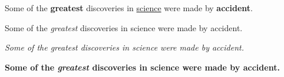 \documentclass{article}
\begin{document}
    Some of the \textbf{greatest} discoveries in \underline{science} were made by \textbf{accident}.

    Some of the \emph{greatest} discoveries in science were made by accident.

    \textit{Some of the \emph{greatest} discoveries in science were made by accident.}

    \textbf{Some of the \emph{greatest} discoveries in science were made by accident.}
\end{document}
